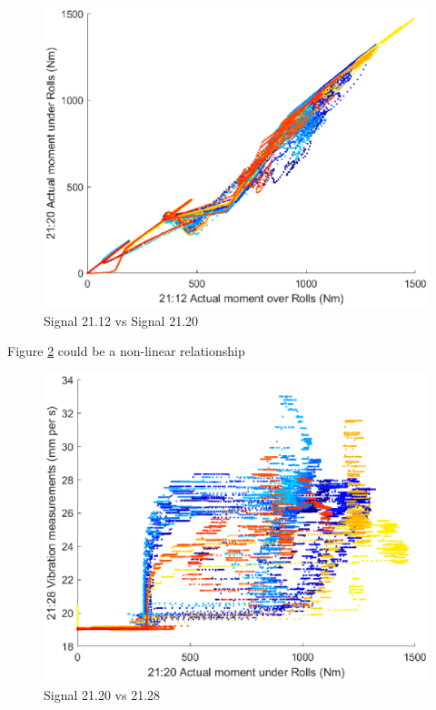\documentclass{article}
\begin{document}
\begin{figure}[H]
    \centering
    \includegraphics[width=\textwidth, height=\textheight, keepaspectratio]{figures/Signal21_12vSignal21_20.eps}
    \caption{Signal 21.12 vs Signal 21.20}
    \label{fig:Signal21_12vSignal21_20}
\end{figure}	
Figure \ref{fig:Signal21_20vSignal21_28} could be a non-linear relationship
\begin{figure}[H]
    \centering
    \includegraphics[width=\textwidth, height=\textheight, keepaspectratio]{figures/Signal21_20vSignal21_28.eps}
    \caption{Signal 21.20 vs 21.28}
    \label{fig:Signal21_20vSignal21_28}
\end{figure}	
	
\end{document}
